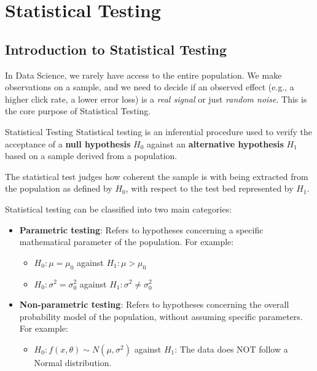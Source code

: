\section{Statistical Testing}

\subsection{Introduction to Statistical Testing}

In Data Science, we rarely have access to the entire population. We make observations on a sample, and we need to decide if an observed effect (e.g., a higher click rate, a lower error loss) is a \textit{real signal} or just \textit{random noise}. This is the core purpose of Statistical Testing.

\begin{defbox}{Statistical Testing}
 Statistical testing is an inferential procedure used to verify the acceptance of a \textbf{null hypothesis} $H_0$ against an \textbf{alternative hypothesis} $H_1$ based on a sample derived from a population. 
\end{defbox}

The statistical test judges how coherent the sample is with being extracted from the population as defined by $H_0$, with respect to the test bed represented by $H_1$.

Statistical testing can be classified into two main categories:

\begin{itemize}
 \item \textbf{Parametric testing}: Refers to hypotheses concerning a specific mathematical parameter of the population. For example:
  \begin{itemize}
   \item $H_0: \mu = \mu_0$ against $H_1: \mu > \mu_0$
   \item $H_0: \sigma^2 = \sigma_0^2$ against $H_1: \sigma^2 \neq \sigma_0^2$
  \end{itemize}
  
 \item \textbf{Non-parametric testing}: Refers to hypotheses concerning the overall probability model of the population, without assuming specific parameters. For example:
  \begin{itemize}
   \item $H_0: f(x, \theta) \sim N(\mu, \sigma^2)$ against $H_1$: The data does NOT follow a Normal distribution.
  \end{itemize}
\end{itemize}

